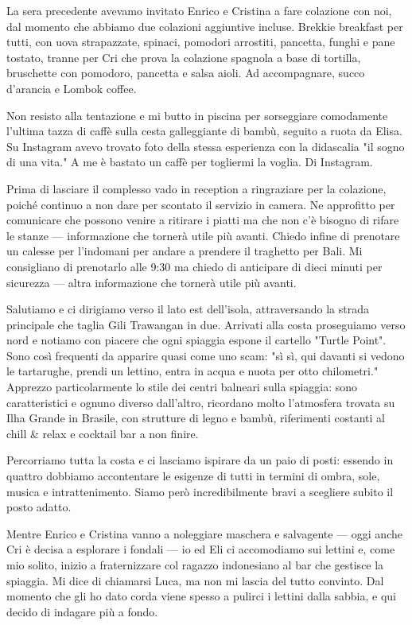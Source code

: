 La sera precedente avevamo invitato Enrico e Cristina a fare colazione con noi, dal momento che abbiamo due colazioni aggiuntive incluse. Brekkie breakfast per tutti, con uova strapazzate, spinaci, pomodori arrostiti, pancetta, funghi e pane tostato, tranne per Cri che prova la colazione spagnola a base di tortilla, bruschette con pomodoro, pancetta e salsa aioli. Ad accompagnare, succo d'arancia e Lombok coffee.

Non resisto alla tentazione e mi butto in piscina per sorseggiare comodamente l'ultima tazza di caffè sulla cesta galleggiante di bambù, seguito a ruota da Elisa. Su Instagram avevo trovato foto della stessa esperienza con la didascalia "il sogno di una vita." A me è bastato un caffè per togliermi la voglia. Di Instagram.

Prima di lasciare il complesso vado in reception a ringraziare per la colazione, poiché continuo a non dare per scontato il servizio in camera. Ne approfitto per comunicare che possono venire a ritirare i piatti ma che non c'è bisogno di rifare le stanze — informazione che tornerà utile più avanti. Chiedo infine di prenotare un calesse per l'indomani per andare a prendere il traghetto per Bali. Mi consigliano di prenotarlo alle 9:30 ma chiedo di anticipare di dieci minuti per sicurezza — altra informazione che tornerà utile più avanti.

Salutiamo e ci dirigiamo verso il lato est dell'isola, attraversando la strada principale che taglia Gili Trawangan in due. Arrivati alla costa proseguiamo verso nord e notiamo con piacere che ogni spiaggia espone il cartello "Turtle Point". Sono così frequenti da apparire quasi come uno scam: "sì sì, qui davanti si vedono le tartarughe, prendi un lettino, entra in acqua e nuota per otto chilometri." Apprezzo particolarmente lo stile dei centri balneari sulla spiaggia: sono caratteristici e ognuno diverso dall'altro, ricordano molto l'atmosfera trovata su Ilha Grande in Brasile, con strutture di legno e bambù, riferimenti costanti al chill \& relax e cocktail bar a non finire.

Percorriamo tutta la costa e ci lasciamo ispirare da un paio di posti: essendo in quattro dobbiamo accontentare le esigenze di tutti in termini di ombra, sole, musica e intrattenimento. Siamo però incredibilmente bravi a scegliere subito il posto adatto.

Mentre Enrico e Cristina vanno a noleggiare maschera e salvagente — oggi anche Cri è decisa a esplorare i fondali — io ed Eli ci accomodiamo sui lettini e, come mio solito, inizio a fraternizzare col ragazzo indonesiano al bar che gestisce la spiaggia. Mi dice di chiamarsi Luca, ma non mi lascia del tutto convinto. Dal momento che gli ho dato corda viene spesso a pulirci i lettini dalla sabbia, e qui decido di indagare più a fondo.

